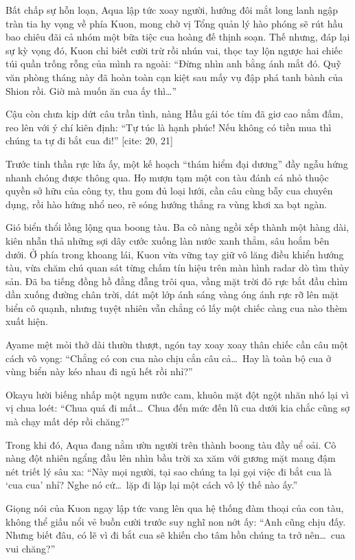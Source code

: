 \documentclass[../main.tex]{subfiles}
\begin{document}
Bất chấp sự hỗn loạn, Aqua lập tức xoay người, hướng đôi mắt long lanh ngập tràn tia hy vọng về phía Kuon, mong chờ vị Tổng quản lý hào phóng sẽ rút hầu bao chiêu đãi cả nhóm một bữa tiệc cua hoàng đế thịnh soạn. Thế nhưng, đáp lại sự kỳ vọng đó, Kuon chỉ biết cười trừ rồi nhún vai, thọc tay lộn ngược hai chiếc túi quần trống rỗng của mình ra ngoài: ``Đừng nhìn anh bằng ánh mắt đó. Quỹ văn phòng tháng này đã hoàn toàn cạn kiệt sau mấy vụ đập phá tanh bành của Shion rồi. Giờ mà muốn ăn cua ấy thì\dots''

Cậu còn chưa kịp dứt câu trần tình, nàng Hầu gái tóc tím đã giơ cao nắm đấm, reo lên với ý chí kiên định: ``Tự túc là hạnh phúc! Nếu không có tiền mua thì chúng ta tự đi bắt cua đi!'' [cite: 20, 21]

Trước tinh thần rực lửa ấy, một kế hoạch ``thám hiểm đại dương'' đầy ngẫu hứng nhanh chóng được thông qua. Họ mượn tạm một con tàu đánh cá nhỏ thuộc quyền sở hữu của công ty, thu gom đủ loại lưới, cần câu cùng bẫy cua chuyên dụng, rồi hào hứng nhổ neo, rẽ sóng hướng thẳng ra vùng khơi xa bạt ngàn.

Gió biển thổi lồng lộng qua boong tàu. Ba cô nàng ngồi xếp thành một hàng dài, kiên nhẫn thả những sợi dây cước xuống làn nước xanh thẳm, sâu hoắm bên dưới. Ở phía trong khoang lái, Kuon vừa vững tay giữ vô lăng điều khiển hướng tàu, vừa chăm chú quan sát từng chấm tín hiệu trên màn hình radar dò tìm thủy sản. Đã ba tiếng đồng hồ đằng đẵng trôi qua, vầng mặt trời đỏ rực bắt đầu chìm dần xuống đường chân trời, dát một lớp ánh sáng vàng óng ánh rực rỡ lên mặt biển cô quạnh, nhưng tuyệt nhiên vẫn chẳng có lấy một chiếc càng cua nào thèm xuất hiện.

Ayame mệt mỏi thở dài thườn thượt, ngón tay xoay xoay thân chiếc cần câu một cách vô vọng: ``Chẳng có con cua nào chịu cắn câu cả\dots\ Hay là toàn bộ cua ở vùng biển này kéo nhau đi ngủ hết rồi nhỉ?''

Okayu lười biếng nhấp một ngụm nước cam, khuôn mặt đột ngột nhăn nhó lại vì vị chua loét: ``Chua quá đi mất\dots\ Chua đến mức đến lũ cua dưới kia chắc cũng sợ mà chạy mất dép rồi chăng?''

Trong khi đó, Aqua đang nằm ườn người trên thành boong tàu đầy uể oải. Cô nàng đột nhiên ngẩng đầu lên nhìn bầu trời xa xăm với gương mặt mang đậm nét triết lý sâu xa: ``Này mọi người, tại sao chúng ta lại gọi việc đi bắt cua là `cua cua' nhỉ? Nghe nó cứ\dots\ lặp đi lặp lại một cách vô lý thế nào ấy.''

Giọng nói của Kuon ngay lập tức vang lên qua hệ thống đàm thoại của con tàu, không thể giấu nổi vẻ buồn cười trước suy nghĩ non nớt ấy: ``Anh cũng chịu đấy. Nhưng biết đâu, có lẽ vì đi bắt cua sẽ khiến cho tâm hồn chúng ta trở nên\dots\ cua vui chăng?''
\end{document}
